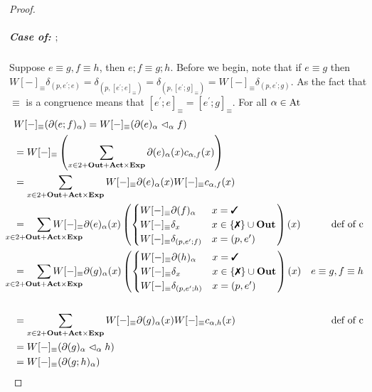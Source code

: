 \documentclass[a4paper,UKenglish,cleveref, autoref, thm-restate]{lipics-v2021}
\newcommand{\cmark}{\text{\ding{51}}}
\newcommand{\xmark}{\text{\ding{55}}}
\newcommand{\Out}{\textbf{\upshape{Out}}}
\newcommand{\Act}{\textbf{\upshape{Act}}}
\newcommand{\At}{\text{\upshape{At}}}
\newcommand{\Exp}{\textbf{\upshape{Exp}}}
\theoremstyle{plain}\newtheoremrep{thm}{Theorem}[section]
\begin{document}
\begin{toappendix}
\begin{proof}
			\subparagraph*{Case of: $;$}
			Suppose $e \equiv g, f\equiv h$, then $e;f \equiv g;h$. Before we begin, note that if $e \equiv g$ then $W[-]_\equiv\delta_{(p,e^\prime;e)} = \delta_{(p, [e^\prime;e]_\equiv)} = \delta_{(p, [e^\prime;g]_\equiv)} = W[-]_\equiv\delta_{(p,e^\prime;g)}$. As the fact that $\equiv$ is a congruence means that $[e^\prime;e]_\equiv = [e^\prime;g]_\equiv$. For all $\alpha \in \At$ \begin{align*}
				&W[-]_\equiv(\partial (e;f)_\alpha) = W[-]_\equiv(\partial(e)_\alpha \vartriangleleft_\alpha f)\\
				&= W[-]_\equiv\left(\sum_{x \in 2+\Out+\Act\times \Exp} \partial(e)_\alpha(x)c_{\alpha, f}(x)\right)\\
				&= \sum_{x \in 2+\Out+\Act\times \Exp} W[-]_\equiv\partial(e)_\alpha(x)W[-]_\equiv c_{\alpha, f}(x)&\\
				&=\quad\sum_{\mathclap{\substack{x \in 2+\Out+\Act\times \Exp}}} W[-]_\equiv\partial(e)_\alpha(x)
				\left(\begin{cases}
					W[-]_\equiv\partial(f)_\alpha & x=\cmark\\
					W[-]_\equiv\delta_x & x\in\{\xmark\} \cup \Out\\
					W[-]_\equiv\delta_{(p,e^\prime;f)}& x=(p,e^\prime)
				\end{cases}\right)(x)&\text{def of c}\\
				&=\quad\sum_{\mathclap{\substack{x \in 2+\Out+\Act\times \Exp}}} W[-]_\equiv\partial(g)_\alpha(x)
				\left(\begin{cases}
					W[-]_\equiv\partial(h)_\alpha & x=\cmark\\
					W[-]_\equiv\delta_x & x\in\{\xmark\} \cup \Out\\
					W[-]_\equiv\delta_{(p,e^\prime;h)}& x=(p,e^\prime)
				\end{cases}\right)(x)&e \equiv g, f \equiv h\\\\
				&= \sum_{x \in 2+\Out+\Act\times \Exp} W[-]_\equiv\partial(g)_\alpha(x)W[-]_\equiv c_{\alpha, h}(x)&\text{def of c}\\
				&= W[-]_\equiv(\partial(g)_\alpha \vartriangleleft_\alpha h) &\\
				&= W[-]_\equiv(\partial (g;h)_\alpha)
			\end{align*}
			

\end{proof}
\end{toappendix}
\end{document}
